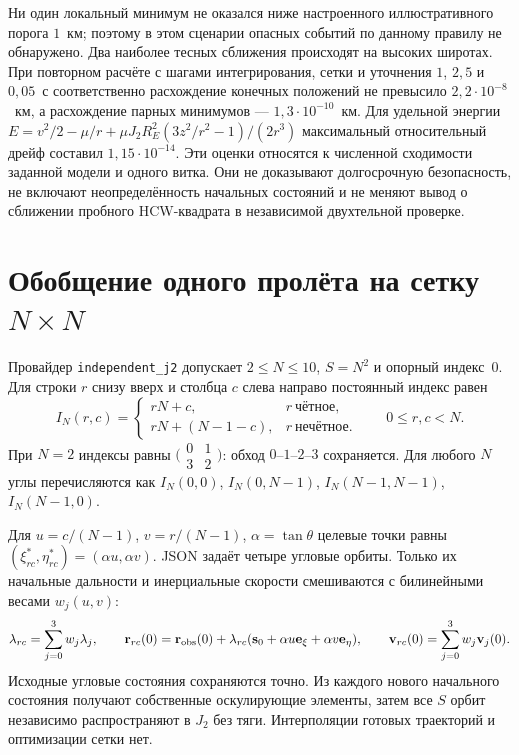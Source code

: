 \documentclass[a4paper,12pt]{article}
\begin{document}
Ни один локальный минимум не оказался ниже
настроенного иллюстративного порога $1$~км;
поэтому в этом сценарии опасных событий по
данному правилу не обнаружено. Два наиболее
тесных сближения происходят на высоких широтах.
При повторном расчёте с шагами интегрирования,
сетки и уточнения $1$, $2{,}5$ и $0{,}05$~с
соответственно расхождение конечных положений
не превысило $2{,}2\cdot10^{-8}$~км, а
расхождение парных минимумов ---
$1{,}3\cdot10^{-10}$~км. Для удельной энергии
$E=v^2/2-\mu/r+\mu J_2R_E^2(3z^2/r^2-1)/(2r^3)$
максимальный относительный дрейф составил
$1{,}15\cdot10^{-14}$.
Эти оценки относятся
к численной сходимости заданной модели и
одного витка. Они не доказывают долгосрочную
безопасность, не включают неопределённость
начальных состояний и не меняют вывод о
сближении пробного HCW-квадрата в независимой
двухтельной проверке.
\section{Обобщение одного пролёта на сетку $N\times N$}
\label{sec:grid_n}

Провайдер \texttt{independent\_j2} допускает
$2\leq N\leq10$, $S=N^2$ и опорный индекс~0.
Для строки $r$ снизу вверх и столбца $c$
слева направо постоянный индекс равен
\begin{equation}
I_N(r,c)=
\begin{cases}
rN+c, & r\ \text{чётное},\\
rN+(N-1-c), & r\ \text{нечётное}.
\end{cases}
\qquad 0\leq r,c<N.
\end{equation}
При $N=2$ индексы равны
$\bigl(\begin{smallmatrix}0&1\\3&2\end{smallmatrix}\bigr)$:
обход $0$--$1$--$2$--$3$ сохраняется.
Для любого $N$ углы перечисляются как
$I_N(0,0)$, $I_N(0,N-1)$,
$I_N(N-1,N-1)$, $I_N(N-1,0)$.

Для $u=c/(N-1)$, $v=r/(N-1)$,
$\alpha=\tan\theta$ целевые точки равны
$(\xi^*_{rc},\eta^*_{rc})=(\alpha u,\alpha v)$.
JSON задаёт четыре угловые орбиты. Только их
начальные дальности и инерциальные скорости
смешиваются с билинейными весами $w_j(u,v)$:
\begin{equation}
\lambda_{rc}=\sum_{j=0}^{3}w_j\lambda_j,
\qquad
\mathbf r_{rc}(0)=\mathbf r_{\rm obs}(0)+
\lambda_{rc}(\mathbf s_0+\alpha u\mathbf e_\xi+
\alpha v\mathbf e_\eta),
\qquad
\mathbf v_{rc}(0)=\sum_{j=0}^{3}w_j\mathbf v_j(0).
\end{equation}
Исходные угловые состояния сохраняются точно.
Из каждого нового начального состояния получают
собственные оскулирующие элементы, затем все
$S$ орбит независимо распространяют в $J_2$
без тяги. Интерполяции готовых траекторий и
оптимизации сетки нет.
\end{document}
